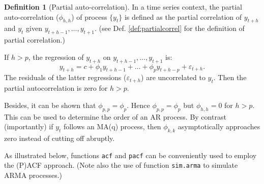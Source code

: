 \documentclass[
  12pt,
]{book}
\theoremstyle{definition}
\newtheorem{definition}{Definition}[chapter]
\theoremstyle{definition}
\theoremstyle{definition}
\theoremstyle{definition}
\theoremstyle{remark}
\begin{document}
\begin{definition}[Partial auto-correlation]
\protect\hypertarget{def:partialAC}{}\label{def:partialAC}In a time series context, the partial auto-correlation (\(\phi_{h,h}\)) of process \(\{y_t\}\) is defined as the partial correlation of \(y_{t+h}\) and \(y_t\) given \(y_{t+h-1},\dots,y_{t+1}\). (see Def. \ref{def:partialcorrel} for the definition of partial correlation.)
\end{definition}

If \(h>p\), the regression of \(y_{t+h}\) on \(y_{t+h-1},\dots,y_{t+1}\) is:
\[
y_{t+h} = c + \phi_1 y_{t+h-1}+\dots+ \phi_p  y_{t+h-p} + \varepsilon_{t+h}.
\]
The residuals of the latter regressions (\(\varepsilon_{t+h}\)) are uncorrelated to \(y_t\). Then the partial autocorrelation is zero for \(h>p\).

Besides, it can be shown that \(\phi_{p,p}=\phi_p\). Hence \(\phi_{p,p}=\phi_p\) but \(\phi_{h,h}=0\) for \(h>p\). This can be used to determine the order of an AR process. By contrast (importantly) if \(y_t\) follows an MA(q) process, then \(\phi_{k,k}\) asymptotically approaches zero instead of cutting off abruptly.

As illustrated below, functions \texttt{acf} and \texttt{pacf} can be conveniently used to employ the (P)ACF approach. (Note also the use of function \texttt{sim.arma} to simulate ARMA processes.)
\end{document}
